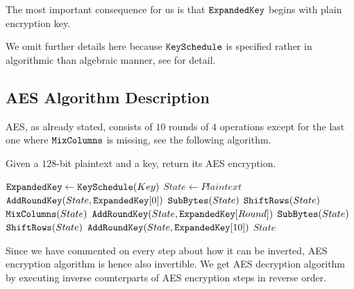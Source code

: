 	\begin{note}
	\label{note:expkey}
		The most important consequence for us is that $\texttt{ExpandedKey}$ begins with plain encryption key.
	\end{note}
	
	We omit further details here because $\texttt{KeySchedule}$ is specified rather in algorithmic than algebraic manner, see \cite[pp.43-45]{daemen2013rijndael} for detail.



\subsection{AES Algorithm Description}

AES, as already stated, consists of $10$ rounds of $4$ operations except for the last one where $\texttt{MixColumns}$ is missing, see the following algorithm.

\begin{alg}
\label{alg:aes}
	Given a $128$-bit plaintext and a key, return its AES encryption.
	\begin{algorithmic}[1]
			\State $\texttt{ExpandedKey} \gets \texttt{KeySchedule}(Key)$
			\State $State \gets Plaintext$ \label{line:stateplain}
			\State $\texttt{AddRoundKey}(State, \texttt{ExpandedKey}[0])$ \label{line:addrk}
				\State $\texttt{SubBytes}(State)$
				\State $\texttt{ShiftRows}(State)$
				\State $\texttt{MixColumns}(State)$
				\State $\texttt{AddRoundKey}(State, \texttt{ExpandedKey}[Round])$
			\EndFor
			\State $\texttt{SubBytes}(State)$
			\State $\texttt{ShiftRows}(State)$
			\State $\texttt{AddRoundKey}(State, \texttt{ExpandedKey}[10])$
			\State\Return $State$
		\EndFunction
	\end{algorithmic}
\end{alg}

\begin{note}
	Since we have commented on every step about how it can be inverted, AES encryption algorithm is hence also invertible. We get AES decryption algorithm by executing inverse counterparts of AES encryption steps in reverse order.
\end{note}




